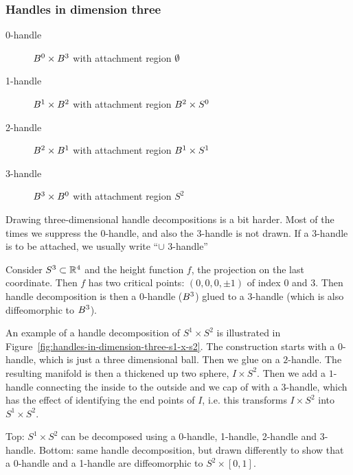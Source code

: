 \subsubsection*{Handles in dimension three}


\begin{description}
    \item[0-handle] $ B^{0} \times B^{3}$ with attachment region $\emptyset$ 
        \hfill{}
    \item[1-handle] $ B^{1} \times B^{2}$ with attachment region $ B^{2} \times S^{0}$
        \hfill{}
    \item[2-handle] $ B^{2} \times B^{1}$ with attachment region $ B^{1} \times S^1$
        \hfill{}
    \item[3-handle] $ B^{3} \times B^{0}$ with attachment region $S^{2}$
        \hfill{}
\end{description}

Drawing three-dimensional handle decompositions is a bit harder. Most of the times we suppress the $0$-handle, and also the $3$-handle is not drawn. If a $3$-handle is to be attached, we usually write ``$\cup $ $3$-handle''

\begin{eg}
    Consider $S^{3} \subset \mathbb{R}^{4}$ and the height function $f$, the projection on the last coordinate.
    Then $f$ has two critical points: $(0, 0, 0, \pm 1)$ of index $0$ and $3$.
    Then handle decomposition is then a $0$-handle ($B^{3}$) glued to a $3$-handle (which is also diffeomorphic to $B^{3}$).
\end{eg}

\begin{eg}
    An example of a handle decomposition of $S^{1} \times S^{2}$ is illustrated in Figure~\ref{fig:handles-in-dimension-three-s1-x-s2}.
    The construction starts with a $0$-handle, which is just a three dimensional ball.
    Then we glue on a $2$-handle.
    The resulting manifold is then a thickened up two sphere, $I \times S^{2}$.
    Then we add a $1$-handle connecting the inside to the outside and we cap of with a $3$-handle, which has the effect of identifying the end points of $I$, i.e. this transforms  $I \times S^{2}$ into $ S^1 \times S^{2}$.
\end{eg}
\begin{marginfigure}
    \centering
    \caption{Top: $ S^1 \times S^{2}$ can be decomposed using a 0-handle, 1-handle, 2-handle and 3-handle.
        Bottom: same handle decomposition, but drawn differently to show that  a 0-handle and a 1-handle are diffeomorphic to $S^{2} \times [0,1]$.
}
    \label{fig:handles-in-dimension-three-s1-x-s2}
\end{marginfigure}


